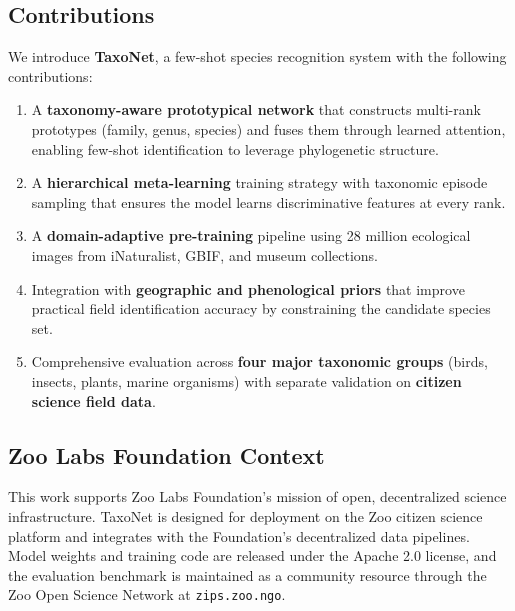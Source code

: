 \documentclass[11pt,a4paper]{article}
\begin{document}
\subsection{Contributions}

We introduce \textbf{TaxoNet}, a few-shot species recognition system
with the following contributions:

\begin{enumerate}
  \item A \textbf{taxonomy-aware prototypical network} that constructs
    multi-rank prototypes (family, genus, species) and fuses them
    through learned attention, enabling few-shot identification to
    leverage phylogenetic structure.

  \item A \textbf{hierarchical meta-learning} training strategy with
    taxonomic episode sampling that ensures the model learns
    discriminative features at every rank.

  \item A \textbf{domain-adaptive pre-training} pipeline using 28
    million ecological images from iNaturalist, GBIF, and museum
    collections.

  \item Integration with \textbf{geographic and phenological priors}
    that improve practical field identification accuracy by
    constraining the candidate species set.

  \item Comprehensive evaluation across \textbf{four major taxonomic
    groups} (birds, insects, plants, marine organisms) with separate
    validation on \textbf{citizen science field data}.
\end{enumerate}

\subsection{Zoo Labs Foundation Context}

This work supports Zoo Labs Foundation's mission of open, decentralized
science infrastructure. TaxoNet is designed for deployment on the Zoo
citizen science platform and integrates with the Foundation's
decentralized data pipelines. Model weights and training code are
released under the Apache 2.0 license, and the evaluation benchmark
is maintained as a community resource through the Zoo Open Science
Network at \texttt{zips.zoo.ngo}.


\end{document}
